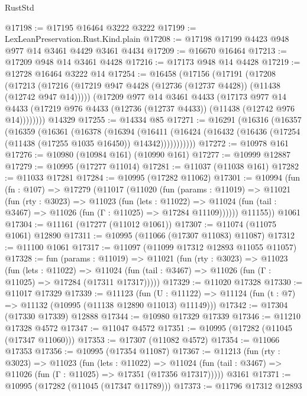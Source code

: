 \begin{lexlean}{RustStd}
\begin{coremodule}
@17198 := @17195 @16464 @3222 @3222
@17199 := LexLeanPreservation.Rust.Kind.plain
@17208 := @17198 @17199 @4423 @948 @977 @14 @3461 @4429 @3461 @4434
@17209 := @16670 @16464
@17213 := @17209 @948 @14 @3461 @4428
@17216 := @17173 @948 @14 @4428
@17219 := @12728 @16464 @3222 @14
@17254 := @16458
    (@17156
      (@17191
        (@17208
          (@17213 (@17216 (@17219 @947 @4428 (@12736 (@12737 @4428)) (@11438 (@12742 @947 @14)))))
          (@17209
            @977
            @14
            @3461
            @4433
            (@17173
              @977
              @14
              @4433
              (@17219 @976 @4433 (@12736 (@12737 @4433)) (@11438 (@12742 @976 @14))))))))
    @14329
@17255 := @14334 @85
@17271 := @16291
    (@16316
      (@16357
        (@16359
          (@16361
            (@16378
              (@16394
                (@16411
                  (@16424 (@16432 (@16436 (@17254 (@11438 (@17255 @1035 @16450)) @14342)))))))))))
@17272 := @10978 @161
@17276 := @10980 (@10984 @161) (@10990 @161)
@17277 := @10999 @12887
@17279 := @10995 (@17277 @11014)
@17281 := @11037 (@11038 @161)
@17282 := @11033 @17281
@17284 := @10995 (@17282 @11062)
@17301 := @10994
    (fun (fn : @107) =>
    @17279
      (@11017
        (@11020
          (fun (params : @11019) =>
          @11021
            (fun (rty : @3023) =>
            @11023
              (fun (lets : @11022) =>
              @11024 (fun (tail : @3467) => @11026 (fun (Γ : @11025) => @17284 @11109))))))
        @11155))
    @1061
@17304 := @11161 (@17277 (@11012 @1061))
@17307 := @11074 (@11075 @1061) @12890
@17311 := @10995 (@11066 (@17307 @11083) @11087)
@17312 := @11100 @1061
@17317 := @11097 (@11099 @17312 @12893 @11055 @11057)
@17328 := fun (params : @11019) =>
  @11021
    (fun (rty : @3023) =>
    @11023
      (fun (lets : @11022) =>
      @11024 (fun (tail : @3467) => @11026 (fun (Γ : @11025) => @17284 (@17311 @17317)))))
@17329 := @11020 @17328
@17330 := @11017 @17329
@17339 := @11123
    (fun (U : @11122) => @11124 (fun (t : @7) => @11132 (@10995 (@11138 @12890 @11013) @11149)))
@17342 := @17304 (@17330 @17339) @12888
@17344 := @10980 @17329 @17339
@17346 := @11210 @17328 @4572
@17347 := @11047 @4572
@17351 := @10995 (@17282 (@11045 (@17347 @11060)))
@17353 := @17307 (@11082 @4572)
@17354 := @11066 @17353
@17356 := @10995 (@17354 @11087)
@17367 := @11213
    (fun (rty : @3023) =>
    @11023
      (fun (lets : @11022) =>
      @11024 (fun (tail : @3467) => @11026 (fun (Γ : @11025) => @17351 (@17356 @17317)))))
    @3161
@17371 := @10995 (@17282 (@11045 (@17347 @11789)))
@17373 := @11796 @17312 @12893

\end{coremodule}
\end{lexlean}
